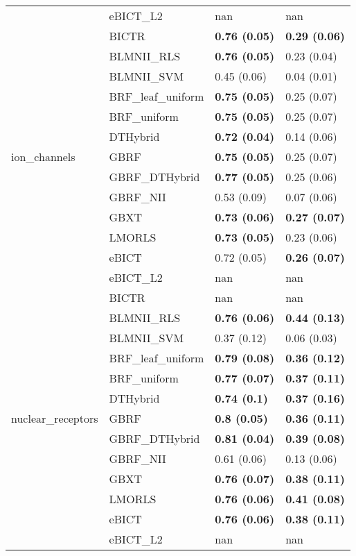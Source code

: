 \begin{tabular}{llll}
 & eBICT\_L2 & nan & nan \\
\cline{1-2}
\multirow[c]{13}{*}{ion\_channels} & BICTR & \textbf{0.76 (0.05)} & \textbf{0.29 (0.06)} \\
 & BLMNII\_RLS & \textbf{0.76 (0.05)} & 0.23 (0.04) \\
 & BLMNII\_SVM & 0.45 (0.06) & 0.04 (0.01) \\
 & BRF\_leaf\_uniform & \textbf{0.75 (0.05)} & 0.25 (0.07) \\
 & BRF\_uniform & \textbf{0.75 (0.05)} & 0.25 (0.07) \\
 & DTHybrid & \textbf{0.72 (0.04)} & 0.14 (0.06) \\
 & GBRF & \textbf{0.75 (0.05)} & 0.25 (0.07) \\
 & GBRF\_DTHybrid & \textbf{0.77 (0.05)} & 0.25 (0.06) \\
 & GBRF\_NII & 0.53 (0.09) & 0.07 (0.06) \\
 & GBXT & \textbf{0.73 (0.06)} & \textbf{0.27 (0.07)} \\
 & LMORLS & \textbf{0.73 (0.05)} & 0.23 (0.06) \\
 & eBICT & 0.72 (0.05) & \textbf{0.26 (0.07)} \\
 & eBICT\_L2 & nan & nan \\
\cline{1-2}
\multirow[c]{13}{*}{nuclear\_receptors} & BICTR & nan & nan \\
 & BLMNII\_RLS & \textbf{0.76 (0.06)} & \textbf{0.44 (0.13)} \\
 & BLMNII\_SVM & 0.37 (0.12) & 0.06 (0.03) \\
 & BRF\_leaf\_uniform & \textbf{0.79 (0.08)} & \textbf{0.36 (0.12)} \\
 & BRF\_uniform & \textbf{0.77 (0.07)} & \textbf{0.37 (0.11)} \\
 & DTHybrid & \textbf{0.74 (0.1)} & \textbf{0.37 (0.16)} \\
 & GBRF & \textbf{0.8 (0.05)} & \textbf{0.36 (0.11)} \\
 & GBRF\_DTHybrid & \textbf{0.81 (0.04)} & \textbf{0.39 (0.08)} \\
 & GBRF\_NII & 0.61 (0.06) & 0.13 (0.06) \\
 & GBXT & \textbf{0.76 (0.07)} & \textbf{0.38 (0.11)} \\
 & LMORLS & \textbf{0.76 (0.06)} & \textbf{0.41 (0.08)} \\
 & eBICT & \textbf{0.76 (0.06)} & \textbf{0.38 (0.11)} \\
 & eBICT\_L2 & nan & nan \\
\cline{1-2}
\bottomrule
\end{tabular}
